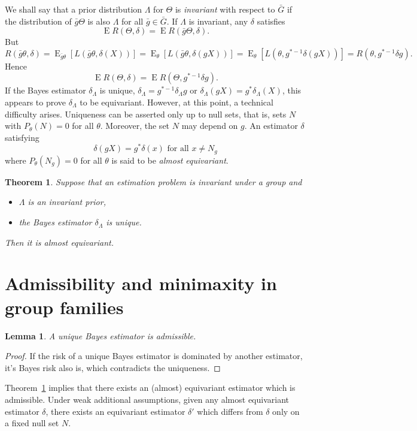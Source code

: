 \documentclass{article}
\DeclareMathOperator{\myE}{E}
\theoremstyle{plain}
\newtheorem{theorem}{Theorem}
\newtheorem{lemma}{Lemma}
\theoremstyle{definition}
\begin{document}
We shall say that a prior distribution $\Lambda$ for $\Theta$ is \emph{invariant} with respect to $\bar{G}$ if the distribution of $\bar{g}\Theta$ is also $\Lambda$ for all $\bar{g}\in\bar{G}$.
If $\Lambda$ is invariant, any $\delta$ satisfies
\begin{equation*}
    \myE R(\Theta,\delta)=\myE R(\bar{g}\Theta,\delta).
\end{equation*}
But
\begin{equation*}
    R(\bar{g}\theta,\delta)=\myE_{\bar{g}\theta}[L(\bar{g}\theta,\delta(X))]=
    \myE_{\theta}[L(\bar{g}\theta,\delta(gX))]=
    \myE_{\theta}[L(\theta,g^{*-1}\delta (gX))]=R(\theta,g^{*-1}\delta g).
\end{equation*}
Hence
\begin{equation*}
    \myE R(\Theta,\delta)=
\myE R(\Theta,g^{*-1}\delta g).
\end{equation*}
If the Bayes estimator $\delta_{\Lambda}$ is unique, $\delta_{\Lambda}=g^{*-1}\delta_{\Lambda} g$ or $\delta_{\Lambda}(gX)=g^* \delta_{\Lambda}(X)$, this appears to prove $\delta_{\Lambda}$ to be equivariant.
However, at this point, a technical difficulty arises. Uniqueness can be asserted only up to null sets, that is, sets $N$ with $P_\theta(N)=0$ for all $\theta$.
Moreover, the set $N$ may depend on $g$.
An estimator $\delta$ satisfying
\begin{equation*}
    \textrm{$\delta(gX)=g^* \delta(x)$ for all $x\neq N_g$}
\end{equation*}
where $P_\theta (N_g)=0$ for all $\theta$ is said to be \emph{almost equivariant}.
\begin{theorem}\label{theorem3}
    Suppose that an estimation problem is invariant under a group and
    \begin{itemize}
        \item$\Lambda$ is an invariant prior,
        \item
            the Bayes estimator $\delta_{\Lambda}$ is unique.
    \end{itemize}
           Then it is almost equivariant.
\end{theorem}

\section{Admissibility and minimaxity in group families}
\begin{lemma}
    A unique Bayes estimator is admissible.
\end{lemma}
\begin{proof}
    If the risk of a unique Bayes estimator is dominated by another estimator, it's Bayes risk also is, which contradicts the uniqueness.
\end{proof}
Theorem~\ref{theorem3} implies that there exists an (almost) equivariant estimator which is admissible.
Under weak additional assumptions, given any almost equivariant estimator $\delta$, there exists an equivariant estimator $\delta'$ which differs from $\delta$ only on a fixed null set $N$.
\end{document}
